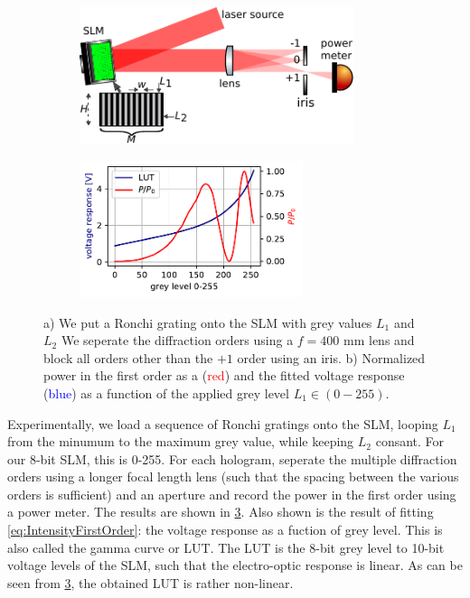 \begin{figure}
	\begin{subfigure}{.54\linewidth}
		\includegraphics[height=4cm]{figures/LUTcalibrationSetup.pdf}
		\caption{}
		\label{fig:LUTCalibrationSetup}
	\end{subfigure}
	\hfill
	\begin{subfigure}{.44\linewidth}
		\includegraphics[height=4cm]{figures/lut_plot.pdf}
		\caption{}
		\label{fig:LUTcalibration}
	\end{subfigure}
	\caption{a) We put a Ronchi grating onto the SLM with grey values $L_1$ and $L_2$ We seperate the diffraction orders using a $f=400$ mm lens and block all orders other than the $+1$ order using an iris. b) Normalized power in the first order as a (\textcolor{red}{red}) and the fitted voltage response (\textcolor{blue}{blue}) as a function of the applied grey level $L_1 \in (0-255)$.}
\end{figure}

Experimentally, we load a sequence of Ronchi gratings onto the SLM, looping $L_1$ from the minumum to the maximum grey value, while keeping $L_2$ consant. For our 8-bit SLM, this is 0-255. For each hologram, seperate the multiple diffraction orders using a longer focal length lens (such that the spacing between the various orders is sufficient) and an aperture and record the power in the first order using a power meter. The results are shown in \cref{fig:LUTcalibration}. Also shown is the result of fitting \cref{eq:IntensityFirstOrder}: the voltage response as a fuction of grey level. This is also called the gamma curve or \ac{LUT}. The LUT is the 8-bit grey level to 10-bit voltage levels of the SLM, such that the electro-optic response is linear. As can be seen from \cref{fig:LUTcalibration}, the obtained LUT is rather non-linear.

